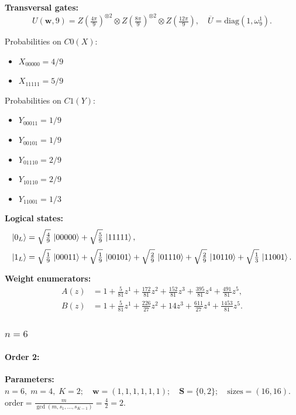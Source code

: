 \documentclass[11pt]{article}
\begin{document}
\noindent\textbf{Transversal gates:}
\[
    U(\mathbf w,9)=Z \left(\tfrac{4\pi}{9}\right)^{\otimes2} \otimes Z \left(\tfrac{8\pi}{9}\right)^{\otimes2} \otimes Z \left(\tfrac{12\pi}{9}\right),\quad
    \overline U=\mathrm{diag}(1,\omega_{9}^{1}).
\]

Probabilities on $C0 (X)$:
\begin{itemize}
    \item $X_{00000} = 4/9$
    \item $X_{11111} = 5/9$
\end{itemize}

Probabilities on $C1 (Y)$:
\begin{itemize}
    \item $Y_{00011} = 1/9$
    \item $Y_{00101} = 1/9$
    \item $Y_{01110} = 2/9$
    \item $Y_{10110} = 2/9$
    \item $Y_{11001} = 1/3$
\end{itemize}

\noindent\textbf{Logical states:}
\begin{align*}
\ket{0_L} &= \sqrt{\tfrac{4}{9}}\,\ket{00000} + \sqrt{\tfrac{5}{9}}\,\ket{11111},
\\[2pt]
\ket{1_L} &= \sqrt{\tfrac{1}{9}}\,\ket{00011} + \sqrt{\tfrac{1}{9}}\,\ket{00101} + \sqrt{\tfrac{2}{9}}\,\ket{01110} + \sqrt{\tfrac{2}{9}}\,\ket{10110} + \sqrt{\tfrac{1}{3}}\,\ket{11001}.
\end{align*}

\noindent\textbf{Weight enumerators:}
\begin{align*}
A(z) &= 1 + \tfrac{5}{81}z^{1} + \tfrac{172}{81}z^{2} + \tfrac{152}{81}z^{3} + \tfrac{395}{81}z^{4} + \tfrac{491}{81}z^{5},\\[2pt]
B(z) &= 1 + \tfrac{5}{81}z^{1} + \tfrac{226}{27}z^{2} + 14z^{3} + \tfrac{611}{27}z^{4} + \tfrac{1453}{81}z^{5}.
\end{align*}

\subsubsection{$n=6$}
\label{subsubsec:K2n6}
\paragraph{\textbf{Order 2:}}
\noindent\textbf{Parameters:} $n=6,\; m=4,\; K=2;\quad \mathbf w=(1, 1, 1, 1, 1, 1);\quad \mathbf S=\{0, 2\};\quad \text{sizes}=\left(16, 16\right).$ $\displaystyle \text{order}=\frac{m}{\gcd(m,s_1,\dots,s_{K-1})}=\frac{4}{2}=2.$
\end{document}
